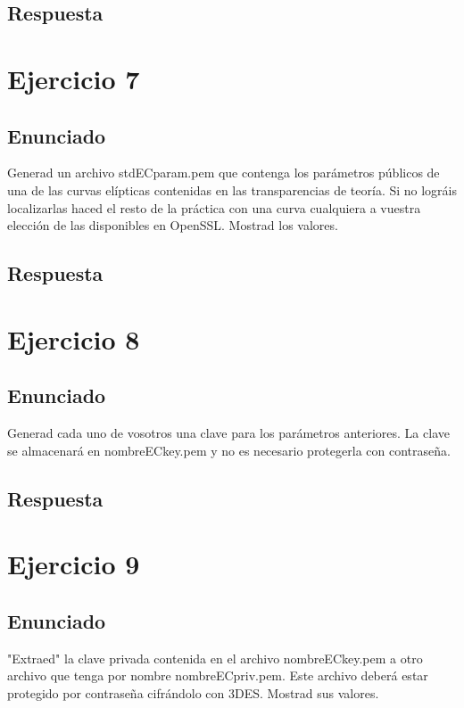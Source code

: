 \documentclass[10pt,a4paper,spanish]{report}
\begin{document}
\section{Respuesta}
\noindent

\chapter{Ejercicio 7}

\section{Enunciado}
\noindent
Generad un archivo stdECparam.pem que contenga los parámetros públicos de una de las curvas elípticas contenidas en las transparencias de teoría. Si no lográis localizarlas haced el resto de la práctica con una curva cualquiera a vuestra elección de las disponibles en OpenSSL. Mostrad los valores.

\section{Respuesta}
\noindent

\chapter{Ejercicio 8}

\section{Enunciado}
\noindent
Generad cada uno de vosotros una clave para los parámetros anteriores. La clave se almacenará en nombreECkey.pem y no es necesario protegerla con contraseña.

\section{Respuesta}
\noindent

\chapter{Ejercicio 9}

\section{Enunciado}
\noindent
"Extraed" la clave privada contenida en el archivo nombreECkey.pem a otro archivo que tenga por nombre nombreECpriv.pem. Este archivo deberá estar protegido por contraseña cifrándolo con 3DES. Mostrad sus valores.
\end{document}
